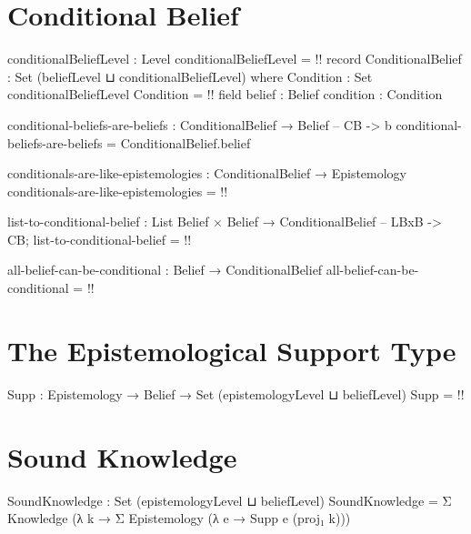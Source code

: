 \documentclass{article}
\begin{document}
\section{Conditional Belief}

\begin{code}
conditionalBeliefLevel : Level
conditionalBeliefLevel = {!!}
record ConditionalBelief : Set (beliefLevel ⊔ conditionalBeliefLevel) where
  Condition : Set conditionalBeliefLevel
  Condition = {!!}
  field
    belief : Belief
    condition : Condition
\end{code}

\begin{code}
conditional-beliefs-are-beliefs : ConditionalBelief → Belief -- CB -> b
conditional-beliefs-are-beliefs = ConditionalBelief.belief
\end{code}

\begin{code}
conditionals-are-like-epistemologies :
  ConditionalBelief → Epistemology
conditionals-are-like-epistemologies = {!!}
\end{code}

\begin{code}
list-to-conditional-belief :
  List Belief × Belief → ConditionalBelief  -- LBxB -> CB;
list-to-conditional-belief = {!!}
\end{code}

\begin{code}
all-belief-can-be-conditional : Belief → ConditionalBelief
all-belief-can-be-conditional = {!!}
\end{code}

\section{The Epistemological Support Type}

\begin{code}
Supp : Epistemology → Belief → Set (epistemologyLevel ⊔ beliefLevel)
Supp = {!!}
\end{code}

\section{Sound Knowledge}

\begin{code}
SoundKnowledge : Set (epistemologyLevel ⊔ beliefLevel)
SoundKnowledge = Σ Knowledge (λ k → Σ Epistemology (λ e → Supp e (proj₁ k)))
\end{code}
\end{document}
